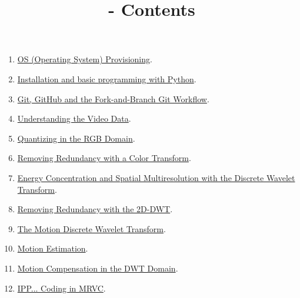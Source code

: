 
\title{\SM - Contents}

\maketitle

\begin{enumerate}
\item \href{https://sistemas-multimedia.github.io/milestones/01-provisioning/}{OS (Operating System) Provisioning}.
\item \href{https://sistemas-multimedia.github.io/milestones/02-python/}{Installation and basic programming with Python}.
\item \href{https://sistemas-multimedia.github.io/milestones/03-git/}{Git, GitHub and the Fork-and-Branch Git Workflow}.
\item \href{https://sistemas-multimedia.github.io/milestones/04-the_data/}{Understanding the Video Data}.
\item \href{https://sistemas-multimedia.github.io/milestones/05-quantization/}{Quantizing in the RGB Domain}.
\item \href{https://sistemas-multimedia.github.io/milestones/06-color_transform/}{Removing Redundancy with a Color Transform}.
\item \href{https://sistemas-multimedia.github.io/milestones/07-DWT/}{Energy Concentration and Spatial Multiresolution with the Discrete Wavelet Transform}.
\item \href{https://sistemas-multimedia.github.io/milestones/08-2D-DWT/}{Removing Redundancy with the 2D-DWT}.
\item \href{https://sistemas-multimedia.github.io/milestones/09-MDWT/}{The Motion Discrete Wavelet Transform}.
\item \href{https://sistemas-multimedia.github.io/milestones/10-ME/}{Motion Estimation}.
\item \href{https://sistemas-multimedia.github.io/milestones/11-MC_in_DWT_domain/}{Motion Compensation in the DWT Domain}.
\item \href{https://sistemas-multimedia.github.io/milestones/12-IPP_coding/}{IPP... Coding in MRVC}.
\end{enumerate}
